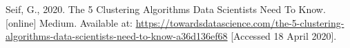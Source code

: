 \documentclass[conference,a4paper]{IEEEtran}
\begin{document}


\clearpage
\begin{thebibliography}{9}
	
	\label{bib:georgeSeif}
	Seif, G., 2020. The 5 Clustering Algorithms Data Scientists Need To Know. [online] Medium. 
	Available at: \href{https://towardsdatascience.com/the-5-clustering-algorithms-data-scientists-need-to-know-a36d136ef68}{https://towardsdatascience.com/the-5-clustering-algorithms-data-scientists-need-to-know-a36d136ef68}
	[Accessed 18 April 2020].

\end{thebibliography}
\end{document}

